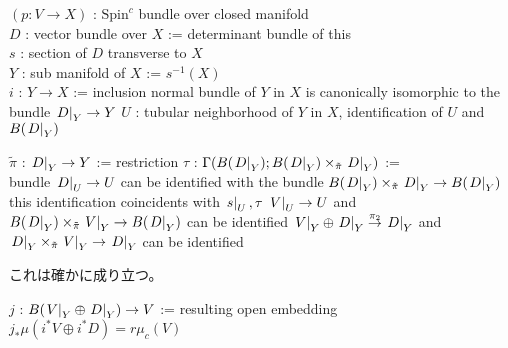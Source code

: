 \begin{Theorem}
\itemwhen
  \For \((p : V \to X)\) : \(\text{Spin}^c\) bundle over closed manifold \\
  \Let \(D\) : vector bundle over \(X\) := determinant bundle of this \\
  \For \(s\) : section of \(D\) transverse to \(X\) \\
  \Let \(Y\) : sub manifold of \(X\) := \(s^{-1}(X)\) \\
  \Let \(i\) : \(Y \to X\) := inclusion
\itemprop
  \Then normal bundle of \(Y\) in \(X\) is canonically isomorphic to the bundle \(\left. {D} \right| _{Y} \to Y\)
\itemwhen
  \Fix \(U\) : tubular neighborhood of \(Y\) in \(X\), identification of \(U\) and \(B(\left. {D} \right| _{Y})\)
\end{Theorem}
  
\begin{Proof}
\itemprof
  \ADMIT
\end{Proof}

\begin{Theorem}
\itemwhen
  \Let \(\tilde{\pi}\) : \(\left. {D} \right| _{Y} \to Y\) := restriction
\itemprop
  \Define \(\tau\) : \(\Gamma(B(\left. {D} \right| _{Y}); B(\left. {D} \right| _{Y}) \times_{\tilde{\pi}} \left. {D} \right| _{Y})\) :=  \\
  \Then bundle \(\left. {D} \right| _{U} \to U\) can be identified with the bundle \(B(\left. {D} \right| _{Y}) \times_{\tilde{\pi}} \left. {D} \right| _{Y} \to B(\left. {D} \right| _{Y})\) \\
  \Then this identification coincidents with \(\left. {s} \right| _{U} , \tau\)
\itemprop
  \Then \(\left. {V} \right| _{U} \to U\) and \(B(\left. {D} \right| _{Y}) \times_{\tilde{\pi}}\left. {V} \right| _{Y} \to B(\left. {D} \right| _{Y})\) can be identified
\itemprop
  \Then \(\left. {V} \right| _{Y} \oplus \left. {D} \right| _{Y} \overset{\pi_2}{\to} \left. {D} \right| _{Y}\) and \(\left. {D} \right| _{Y} \times_{\tilde{\pi}} \left. {V} \right| _{Y} \to \left. {D} \right| _{Y}\) can be identified
\end{Theorem}

\begin{Proof}
\itemprof
  \ADMIT
\itemprof
  \ADMIT
\itemprof
  これは確かに成り立つ。
\end{Proof}

\begin{Theorem}
\itemdefi
  \Define \(j\) : \(B(\left. {V} \right| _{Y} \oplus \left. {D} \right| _{Y}) \to V\) := resulting open embedding
\itemprop
  \Then \(j_* \mu(i^* V \oplus i^* D) = r \mu_c(V)\)
\end{Theorem}

